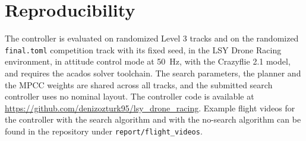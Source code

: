 \documentclass[conference]{IEEEtran}
\begin{document}
\appendices
\section{Reproducibility}
The controller is evaluated on randomized Level 3 tracks and on the randomized \texttt{final.toml} competition track with its fixed seed, in the LSY Drone Racing environment, in attitude control mode at 50~Hz, with the Crazyflie 2.1 model, and requires the acados solver toolchain. The search parameters, the planner and the MPCC weights are shared across all tracks, and the submitted search controller uses no nominal layout. The controller code is available at \url{https://github.com/denizozturk95/lsy_drone_racing}. Example flight videos for the controller with the search algorithm and with the no-search algorithm can be found in the repository under \texttt{report/flight\_videos}.
\end{document}
